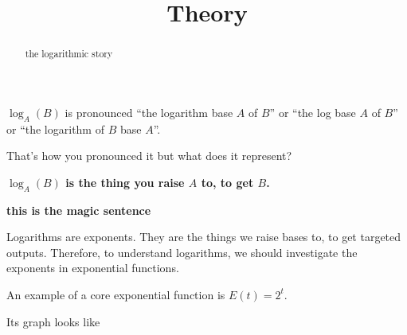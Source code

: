 \documentclass{ximera}
\title{Theory}
\begin{document}
\begin{abstract}
the logarithmic story
\end{abstract}
\maketitle




$\log_A(B)$ is pronounced ``the logarithm base $A$ of $B$'' or ``the log base $A$ of $B$'' or ``the logarithm of $B$ base $A$''. 


That's how you pronounced it but what does it represent?

\begin{center}
\textbf{\textcolor{red!70!black}{$\log_A(B)$ is the thing you raise $A$ to, to get $B$.}} 

\textbf{\textcolor{purple!85!blue}{this is the magic sentence}}
\end{center}


Logarithms are exponents.  They are the things we raise bases to, to get targeted outputs. Therefore, to understand logarithms, we should investigate the exponents in exponential functions. 











An example of a core exponential function is $E(t) = 2^t$.  

Its graph looks like







\begin{image}
\end{image}
\end{document}

